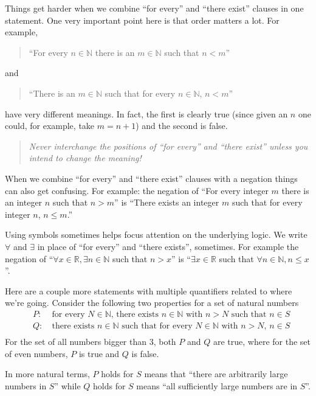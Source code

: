 \documentclass[12pt]{amsart}
\newcommand{\R}{{\mathbb{R}}}
\newcommand{\N}{\mathbb{N}}
\numberwithin{equation}{section}
\theoremstyle{plain} %
\theoremstyle{definition}
\theoremstyle{remark}
\begin{document}
Things get harder when we combine ``for every'' and ``there exist'' clauses in one statement. 
One very important point here is that order matters a lot. For example,
\begin{quote}
	``For every $n \in \N$ there is an $m \in \N$ such that $n < m$''
\end{quote}
and
\begin{quote}
	``There is an $m \in \N$ such that for every $n \in \N$,  $n <  m$''
\end{quote}
have very different meanings. In fact, the first is clearly true (since given an $n$ one could, for example, take $m = n +1$) and the second is false. 
\begin{quote}
	{\Large \em Never interchange the positions of ``for every'' and ``there exist'' unless you intend to change the meaning!}
\end{quote}



When we combine ``for every'' and ``there exist'' clauses with a negation things can also get confusing. 
For example: the negation of 
``For every integer $m$ there is an integer $n$
such that $n > m$'' is ``There exists an integer $m$ such that for every integer $n$, $n \leq m$.'' 

Using symbols sometimes helps focus attention on the underlying logic. We write  $\forall$ and $\exists$ in place of ``for every'' and ``there exists'', sometimes. For example 
the negation of ``$\forall x \in \R,  \exists n \in \N$ such that $n > x$'' is ``$\exists x \in \R$ such that $\forall n \in \N, n \leq x$''. 

Here are a couple more statements with multiple quantifiers related to where we're going. Consider the following two properties for a set of natural numbers
\begin{align*} 
&P: \ &\text{for every $N\in\N$, there exists $n\in \N$ with $n>N$ such that $n\in S$}\\
&Q: \ &\text{there exists $n\in \N$  such that for every $N\in\N$ with $n>N$, $n\in S$}\\
\end{align*}
For the set of all numbers bigger than 3, both $P$ and $Q$ are true, where for the set of even numbers, $P$ is true and $Q$ is false. 

In more natural terms, $P$ holds for $S$ means that ``there are arbitrarily large numbers in $S$'' while $Q$ holds for $S$ means ``all sufficiently large numbers are in $S$''.
\end{document}
